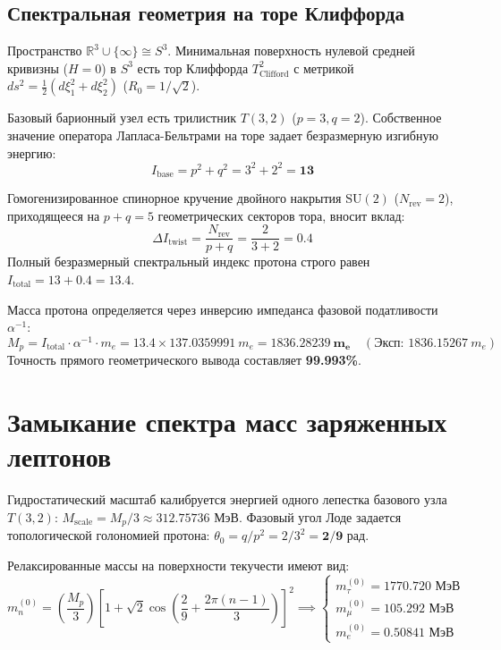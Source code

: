 \documentclass[12pt,a4paper]{article}
\begin{document}
	\subsection{Спектральная геометрия на торе Клиффорда}
	Пространство $\mathbb{R}^3 \cup \{\infty\} \cong S^3$. Минимальная поверхность нулевой средней кривизны ($H=0$) в $S^3$ есть тор Клиффорда $T^2_{\text{Clifford}}$ с метрикой $ds^2 = \frac{1}{2}(d\xi_1^2 + d\xi_2^2)$ ($R_0 = 1/\sqrt{2}$).
	
	Базовый барионный узел есть трилистник $T(3,2)$ ($p=3, q=2$). Собственное значение оператора Лапласа-Бельтрами на торе задает безразмерную изгибную энергию:
	\begin{equation}
		I_{\text{base}} = p^2 + q^2 = 3^2 + 2^2 = \mathbf{13}
	\end{equation}
	
	Гомогенизированное спинорное кручение двойного накрытия $\mathrm{SU}(2)$ ($N_{\text{rev}} = 2$), приходящееся на $p+q = 5$ геометрических секторов тора, вносит вклад:
	\begin{equation}
		\Delta I_{\text{twist}} = \frac{N_{\text{rev}}}{p + q} = \frac{2}{3 + 2} = \mathbf{0.4}
	\end{equation}
	Полный безразмерный спектральный индекс протона строго равен $I_{\text{total}} = 13 + 0.4 = \mathbf{13.4}$.
	
	Масса протона определяется через инверсию импеданса фазовой податливости $\alpha^{-1}$:
	\begin{equation}
		M_p = I_{\text{total}} \cdot \alpha^{-1} \cdot m_e = 13.4 \times 137.0359991 \ m_e = \mathbf{1836.28239 \ m_e} \quad (\text{Эксп: } 1836.15267 \ m_e)
	\end{equation}
	Точность прямого геометрического вывода составляет \textbf{99.993\%}.
	
	\section{Замыкание спектра масс заряженных лептонов}
	
	Гидростатический масштаб калибруется энергией одного лепестка базового узла $T(3,2)$: $M_{\text{scale}} = M_p/3 \approx 312.75736$ МэВ. Фазовый угол Лоде задается топологической голономией протона: $\theta_0 = q/p^2 = 2/3^2 = \mathbf{2/9}$ рад.
	
	Релаксированные массы на поверхности текучести имеют вид:
	\begin{equation}
		m_n^{(0)} = \left( \frac{M_p}{3} \right) \left[ 1 + \sqrt{2} \cos\left( \frac{2}{9} + \frac{2\pi(n-1)}{3} \right) \right]^2 \implies \begin{cases} 
			m_\tau^{(0)} = \mathbf{1770.720 \text{ МэВ}} \\ 
			m_\mu^{(0)} = \mathbf{105.292 \text{ МэВ}} \\ 
			m_e^{(0)} = \mathbf{0.50841 \text{ МэВ}} 
		\end{cases}
	\end{equation}
	
\end{document}
